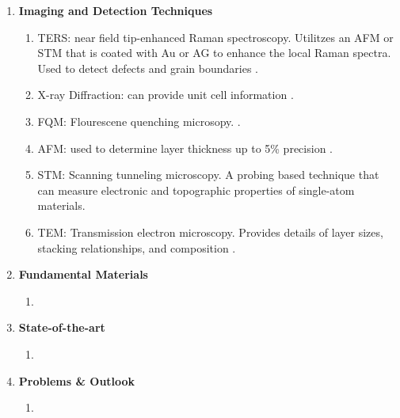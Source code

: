 \documentclass{article}
\begin{document}
\begin{enumerate}
	\item{\textbf{Imaging and Detection Techniques}}
		\begin{enumerate}
			\item{TERS: near field tip-enhanced Raman spectroscopy. Utilitzes an AFM or STM that is coated with Au or AG to enhance the local Raman spectra. Used to detect defects and grain boundaries \cite{acsnanoReview2013}.}
			\item{X-ray Diffraction: can provide unit cell information \cite{acsnanoReview2013}.}
			\item{FQM: Flourescene quenching microsopy. \cite{acsnanoReview2013}.}
			\item{AFM: used to determine layer thickness up to 5\% precision \cite{acsnanoReview2013, Fukuda2008, Osada2011}.}
			\item{STM: Scanning tunneling microscopy. A probing based technique that can measure electronic and topographic properties of single-atom materials. }
			\item{TEM: Transmission electron microscopy. Provides details of layer sizes, stacking relationships, and composition \cite{acsnanoReview2013}.}
		\end{enumerate}

	\item{\textbf{Fundamental Materials}} 
		\begin{enumerate}	%
			\item{}
		\end{enumerate} %

	\item{\textbf{State-of-the-art}}
		\begin{enumerate} %
			\item{}
		\end{enumerate}	%

	\item{\textbf{Problems \& Outlook}}
		\begin{enumerate}	%
			\item{}
		\end{enumerate} %
\end{enumerate} %



\end{document}
